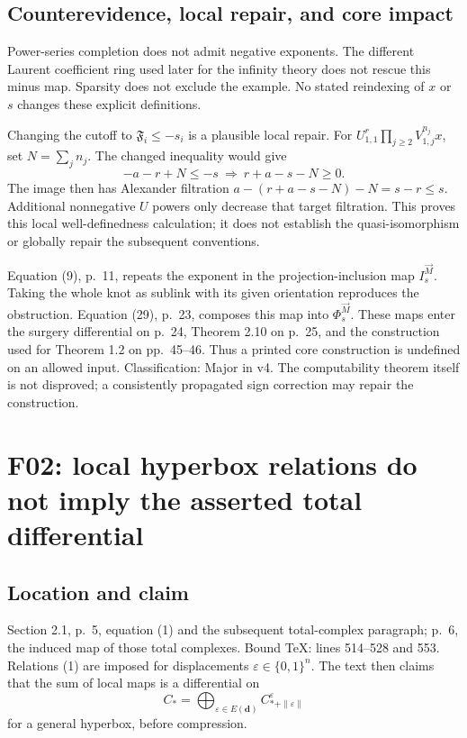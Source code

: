 \documentclass[10pt]{article}
\begin{document}
\subsection*{Counterevidence, local repair, and core impact}
Power-series completion does not admit negative exponents. The different Laurent coefficient ring used later for the infinity theory does not rescue this minus map. Sparsity does not exclude the example. No stated reindexing of \(x\) or \(s\) changes these explicit definitions.\par
Changing the cutoff to \(\mathfrak F_i\leq -s_i\) is a plausible local repair. For \(U_{1,1}^r\prod_{j\geq2}V_{1,j}^{n_j}x\), set \(N=\sum_jn_j\). The changed inequality would give \[-a-r+N\leq-s\ \Longrightarrow\ r+a-s-N\geq0.\] The image then has Alexander filtration \(a-(r+a-s-N)-N=s-r\leq s\). Additional nonnegative \(U\) powers only decrease that target filtration. This proves this local well-definedness calculation; it does not establish the quasi-isomorphism or globally repair the subsequent conventions.\par
Equation (9), p. 11, repeats the exponent in the projection-inclusion map \(I_s^{\vec M}\). Taking the whole knot as sublink with its given orientation reproduces the obstruction. Equation (29), p. 23, composes this map into \(\Phi_s^{\vec M}\). These maps enter the surgery differential on p. 24, Theorem 2.10 on p. 25, and the construction used for Theorem 1.2 on pp. 45–46. Thus a printed core construction is undefined on an allowed input. Classification: Major in v4. The computability theorem itself is not disproved; a consistently propagated sign correction may repair the construction.\par
\section*{F02: local hyperbox relations do not imply the asserted total differential}
\subsection*{Location and claim}
Section 2.1, p. 5, equation (1) and the subsequent total-complex paragraph; p. 6, the induced map of those total complexes. Bound TeX: lines 514–528 and 553. Relations (1) are imposed for displacements \(\varepsilon\in\{0,1\}^n\). The text then claims that the sum of local maps is a differential on \[C_*=\bigoplus_{\varepsilon\in E(\mathbf d)}
 C^\varepsilon_{*+\|\varepsilon\|}\] for a general hyperbox, before compression.\par
\end{document}
